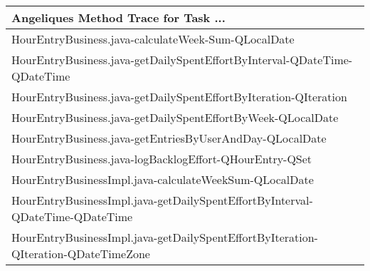 \begin{table}[t!]
\centering\small
\begin{tabular}{l}
\toprule
Angeliques Method Trace for Task ... \\%
\midrule
     HourEntryBusiness.java-calculateWeek-Sum-QLocalDate                                                                  \\%
     HourEntryBusiness.java-getDailySpentEffortByInterval-QDateTime-QDateTime                                    \\%
     HourEntryBusiness.java-getDailySpentEffortByIteration-QIteration                                                     \\%
     HourEntryBusiness.java-getDailySpentEffortByWeek-QLocalDate                                                           \\%
     HourEntryBusiness.java-getEntriesByUserAndDay-QLocalDate                                                            \\%
     HourEntryBusiness.java-logBacklogEffort-QHourEntry-QSet                                              \\%
     HourEntryBusinessImpl.java-calculateWeekSum-QLocalDate                                                   \\%
     HourEntryBusinessImpl.java-getDailySpentEffortByInterval-QDateTime-QDateTime                                  \\%
     HourEntryBusinessImpl.java-getDailySpentEffortByIteration-QIteration-QDateTimeZone                              \\%

\end{tabular}
\end{table}
